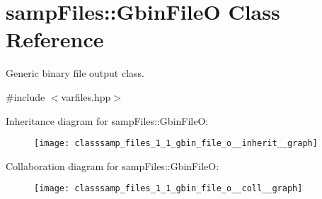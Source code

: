 \hypertarget{classsamp_files_1_1_gbin_file_o}{}\section{samp\+Files\+:\+:Gbin\+FileO Class Reference}
\label{classsamp_files_1_1_gbin_file_o}


Generic binary file output class.  




{\ttfamily \#include $<$varfiles.\+hpp$>$}



Inheritance diagram for samp\+Files\+:\+:Gbin\+FileO\+:\nopagebreak
\begin{figure}[H]
\begin{center}
\leavevmode
\texttt{[image: classsamp\_files\_1\_1\_gbin\_file\_o\_\_inherit\_\_graph]}
\end{center}
\end{figure}


Collaboration diagram for samp\+Files\+:\+:Gbin\+FileO\+:\nopagebreak
\begin{figure}[H]
\begin{center}
\leavevmode
\texttt{[image: classsamp\_files\_1\_1\_gbin\_file\_o\_\_coll\_\_graph]}
\end{center}
\end{figure}
